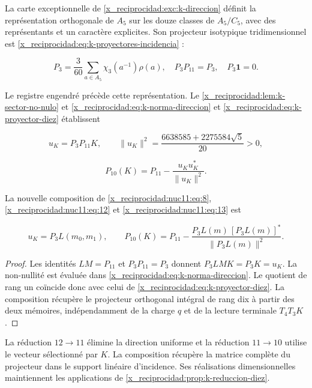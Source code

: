 La carte exceptionnelle de \cref{x_reciprocidad:exc:k-direccion} définit la
représentation orthogonale de \(A_5\) sur les douze classes de
\(A_5/C_5\), avec des représentants et un caractère explicites.
Son projecteur isotypique tridimensionnel est
\eqref{x_reciprocidad:eq:k-proyectores-incidencia} :




\begin{equation}
P_3=\frac3{60}\sum_{a\in A_5}\chi_3(a^{-1})\rho(a),
\quad P_3P_{11}=P_3,\quad P_3\mathbf1=0.
\label{x_reciprocidad:nuc11:eq:12}
\end{equation}



Le registre engendré précède cette représentation.
Le \cref{x_reciprocidad:lem:k-sector-no-nulo} et
\eqref{x_reciprocidad:eq:k-norma-direccion} et \eqref{x_reciprocidad:eq:k-proyector-diez} établissent



\[
u_K=P_3P_{11}K,\qquad
\|u_K\|^2=\frac{6638585+2275584\sqrt5}{20}>0,
\]





\begin{equation}
P_{10}(K)=P_{11}-\frac{u_Ku_K^*}{\|u_K\|^2}.
\label{x_reciprocidad:nuc11:eq:13}
\end{equation}



La nouvelle composition de \eqref{x_reciprocidad:nuc11:eq:8}, \eqref{x_reciprocidad:nuc11:eq:12} et \eqref{x_reciprocidad:nuc11:eq:13} est



\begin{equation}
\boxed{
u_K=P_3L(m_0,m_1),\qquad
P_{10}(K)=P_{11}-
\frac{P_3L(m)\,[P_3L(m)]^*}{\|P_3L(m)\|^2}.
}
\label{x_reciprocidad:nuc11:eq:14}
\end{equation}



\begin{proof}
Les identités \(LM=P_{11}\) et \(P_3P_{11}=P_3\) donnent
\(P_3LMK=P_3K=u_K\).
La non-nullité est évaluée dans \eqref{x_reciprocidad:eq:k-norma-direccion}.
Le quotient de rang un coïncide donc avec celui de
\eqref{x_reciprocidad:eq:k-proyector-diez}.
La composition récupère le projecteur orthogonal intégral de rang
dix à partir des deux mémoires, indépendamment de la charge
\(q\) et de la lecture terminale \(T_4T_3K\).
\end{proof}

La réduction \(12\to11\) élimine la direction uniforme et la
réduction \(11\to10\) utilise le vecteur sélectionné par \(K\).
La composition récupère la matrice complète du projecteur dans le
support linéaire d’incidence.
Ses réalisations dimensionnelles maintiennent les applications de
\cref{x_reciprocidad:prop:k-reduccion-diez}.


